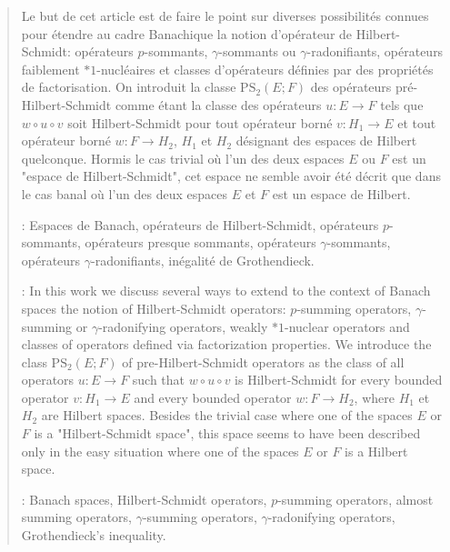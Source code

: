 \documentclass{smfart}
\theoremstyle{plain}
\theoremstyle{definition}
\newcommand {\PHS} {\mathrm{PS}_2}
\begin{document}
\begin{abstract}
  Le but de cet article est de faire le point sur diverses
  possibilités connues pour étendre au cadre Banachique la notion
  d'opérateur de Hilbert-Schmidt: opérateurs $p$-sommants,
  $\gamma$-sommants ou $\gamma$-radonifiants, opérateurs faiblement
  $*1$-nucléaires et classes d'opérateurs définies par des
  propriétés de factorisation. On introduit la classe $\PHS(E; F)$
  des opérateurs pré-Hilbert-Schmidt comme étant la classe des
  opérateurs $u:E\to F$ tels que $w\circ u \circ v$ soit
  Hilbert-Schmidt pour tout opérateur borné $v: H_1\to E$ et tout
  opérateur borné $w:F\to H_2$, $H_1$ et $H_2$ désignant des
  espaces de Hilbert quelconque. Hormis le cas trivial où l'un des
  deux espaces $E$ ou $F$ est un "espace de Hilbert-Schmidt", cet
  espace ne semble avoir été décrit que dans le cas banal où
  l'un des deux espaces $E$ et $F$ est un espace de Hilbert.

\bigskip


: Espaces de Banach, opérateurs de Hilbert-Schmidt,
opérateurs $p$-sommants, opérateurs presque sommants, opérateurs
$\gamma$-sommants, opérateurs $\gamma$-radonifiants, inégalité
de Grothendieck.

\bigskip

:  In this work we discuss several ways to extend to the
context of Banach spaces the notion of Hilbert-Schmidt operators:
$p$-summing operators, $\gamma$-summing or $\gamma$-radonifying
operators, weakly $*1$-nuclear operators and classes of operators
defined via factorization properties. We introduce the class
$\PHS(E; F)$ of pre-Hilbert-Schmidt operators as the class of all
operators $u:E\to F$ such that $w\circ u \circ v$ is Hilbert-Schmidt
for every bounded operator $v: H_1\to E$ and every bounded operator
$w:F\to H_2$, where $H_1$ et $H_2$ are Hilbert spaces.  Besides the
trivial case where one of the spaces $E$ or $F$ is a "Hilbert-Schmidt
space", this space seems to have been described only in the easy
situation where one of the spaces $E$ or $F$ is a Hilbert space.

\bigskip

: Banach spaces, Hilbert-Schmidt operators, $p$-summing
operators, almost summing operators, $\gamma$-summing operators,
$\gamma$-radonifying operators, Grothendieck's inequality.
\end{abstract}


\end{document}

